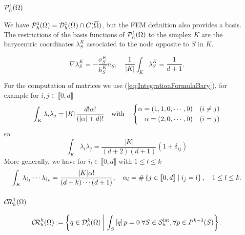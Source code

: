 \subsubsection{$\mathcal{P}^1_h(\Omega)$}
%
We have $\mathcal{P}^1_h(\Omega)= \mathcal{D}_h^1(\Omega)\cap C(\overline{\Omega})$, but the FEM definition also provides a basis.
The restrictions of the basis functions of $\mathcal{P}^1_h(\Omega)$ to the simplex $K$ are the barycentric coordinates $\lambda_S^K$ associated to the node opposite to $S$ in $K$.
%
\begin{yellow}
\begin{equation}\label{eq:}
\nabla \lambda_S^K = -\frac{\sigma_{S}^K}{h_S^K}n_S,\quad \frac{1}{|K|}\int_K \lambda_S^K = \frac{1}{d+1}.
\end{equation}
\end{yellow}%
%
For the computation of matrices we use (\ref{eq:IntegrationFormulaBary}), for example for $i,j\in  \llbracket 0, d \rrbracket$
%
\begin{align*}
\int_K \lambda_i \lambda_j  = |K|\frac{ d!\alpha!}{\left( \left|\alpha\right| + d\right)!} \quad\mbox{with}\quad
\left\{
\begin{aligned}
\alpha = (1,1,0,\cdots,0) \quad &(i\ne j)\\
\alpha = (2,0,\cdots,0) \quad &(i= j)\\
\end{aligned}
\right.
\end{align*}
%
so
%
\begin{equation}\label{eq:}
\int_K \lambda_i \lambda_j  = \frac{ |K|}{(d +2)(d+1)}(1+\delta_{ij})
\end{equation}
%
More generally, we have for $i_l\in  \llbracket 0, d \rrbracket$ with $1\le l\le k $
%
\begin{equation}\label{eq:}
\int_K \lambda_{i_1}\cdots \lambda_{i_k}  = \frac{ |K|\alpha!}{(d +k)\cdots(d+1)},\quad \alpha_l = \#\left\{j\in  \llbracket 0, d \rrbracket\;\middle|\;i_j = l\right\},\quad 1\le l\le k. 
\end{equation}
%


%
\subsubsection{$\mathcal{C\!R}^1_h(\Omega)$}
%
%
\begin{equation}\label{eq:}
\mathcal{C\!R}_h^k(\Omega) := \left\{q \in \mathcal{D}_h^k(\Omega)\;\middle|\;\int_S\left[q\right]p=0\;\forall S\in\mathcal S^{\rm int}_h,\forall p\in P^{k-1}(S)\right\}.
\end{equation}
%  


